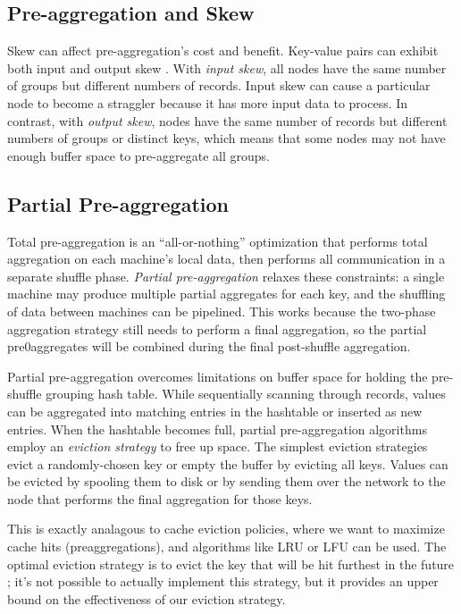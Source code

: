 \documentclass[12pt]{article}
\begin{document}
\subsection{Pre-aggregation and Skew}

Skew can affect pre-aggregation's cost and benefit.  Key-value pairs can exhibit both input and output skew \cite{adaptive-aggregation}.
With \emph{input skew}, all nodes have the same number of groups but different numbers of records.  Input skew can cause a particular node to become a straggler because it has more input data to process.  In contrast, with \emph{output skew}, nodes have the same number of records but different numbers of groups or distinct keys, which means that some nodes may not have enough buffer space to pre-aggregate all groups.

\subsection{Partial Pre-aggregation}

Total pre-aggregation is an ``all-or-nothing'' optimization that performs
total aggregation on each machine's local data, then performs all
communication in a separate shuffle phase.
\emph{Partial pre-aggregation} \cite{partial-preaggregation} relaxes these
constraints: a single machine may produce multiple partial aggregates for each
key, and the shuffling of data between machines can be pipelined.
This works because the two-phase aggregation strategy still needs to perform
a final aggregation, so the partial pre0aggregates will be combined during
the final post-shuffle aggregation.

Partial pre-aggregation overcomes limitations on buffer space for holding the pre-shuffle grouping hash table.
While sequentially scanning through records, values can be aggregated into matching entries in the hashtable or inserted as new entries.
When the hashtable becomes full, partial pre-aggregation algorithms employ an \emph{eviction strategy} to free up space.
The simplest eviction strategies evict a randomly-chosen key or empty the buffer by evicting all keys.
Values can be evicted by spooling them to disk or by sending them over the network to the node that performs the final aggregation for those keys.

This is exactly analagous to cache eviction policies, where we want to maximize cache hits (preaggregations), and algorithms like LRU or LFU can be used.
The optimal eviction strategy is to evict the key that will be hit furthest in
the future \cite{Belady1966}; it's not possible to actually implement this
strategy, but it provides an upper bound on the effectiveness of our eviction
strategy.
\end{document}
